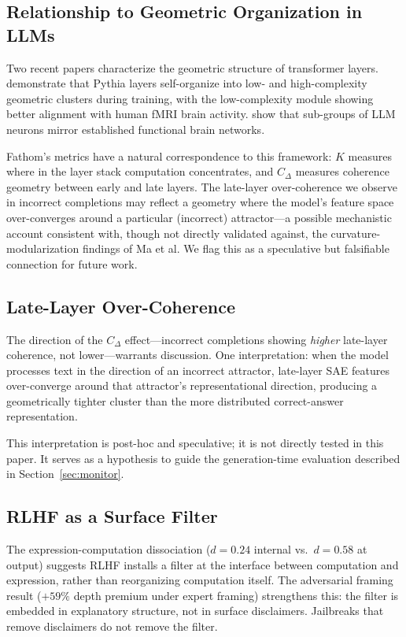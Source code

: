 \documentclass[10pt]{article}
\begin{document}
\subsection{Relationship to Geometric Organization in LLMs}

Two recent papers characterize the geometric structure of transformer layers. \citet{ma2026} demonstrate that Pythia layers self-organize into low- and high-complexity geometric clusters during training, with the low-complexity module showing better alignment with human fMRI brain activity. \citet{wang2024} show that sub-groups of LLM neurons mirror established functional brain networks.

Fathom's metrics have a natural correspondence to this framework: $K$ measures where in the layer stack computation concentrates, and $C_{\Delta}$ measures coherence geometry between early and late layers. The late-layer over-coherence we observe in incorrect completions may reflect a geometry where the model's feature space over-converges around a particular (incorrect) attractor---a possible mechanistic account consistent with, though not directly validated against, the curvature-modularization findings of Ma et al. We flag this as a speculative but falsifiable connection for future work.

\subsection{Late-Layer Over-Coherence}

The direction of the $C_{\Delta}$ effect---incorrect completions showing \textit{higher} late-layer coherence, not lower---warrants discussion. One interpretation: when the model processes text in the direction of an incorrect attractor, late-layer SAE features over-converge around that attractor's representational direction, producing a geometrically tighter cluster than the more distributed correct-answer representation.

This interpretation is post-hoc and speculative; it is not directly tested in this paper. It serves as a hypothesis to guide the generation-time evaluation described in Section~\ref{sec:monitor}.

\subsection{RLHF as a Surface Filter}

The expression-computation dissociation ($d = 0.24$ internal vs.\ $d = 0.58$ at output) suggests RLHF installs a filter at the interface between computation and expression, rather than reorganizing computation itself. The adversarial framing result ($+59\%$ depth premium under expert framing) strengthens this: the filter is embedded in explanatory structure, not in surface disclaimers. Jailbreaks that remove disclaimers do not remove the filter.
\end{document}
